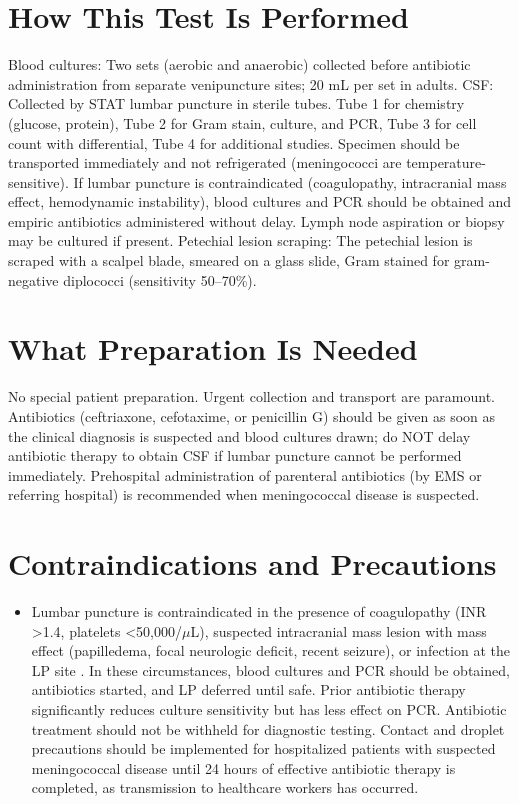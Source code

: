 \section*{How This Test Is Performed}
Blood cultures: Two sets (aerobic and anaerobic) collected before antibiotic administration from separate venipuncture sites; 20 mL per set in adults. CSF: Collected by STAT lumbar puncture in sterile tubes. Tube 1 for chemistry (glucose, protein), Tube 2 for Gram stain, culture, and PCR, Tube 3 for cell count with differential, Tube 4 for additional studies. Specimen should be transported immediately and not refrigerated (meningococci are temperature-sensitive). If lumbar puncture is contraindicated (coagulopathy, intracranial mass effect, hemodynamic instability), blood cultures and PCR should be obtained and empiric antibiotics administered without delay. Lymph node aspiration or biopsy may be cultured if present. Petechial lesion scraping: The petechial lesion is scraped with a scalpel blade, smeared on a glass slide, Gram stained for gram-negative diplococci (sensitivity 50--70\%).

\section*{What Preparation Is Needed}
No special patient preparation. Urgent collection and transport are paramount. Antibiotics (ceftriaxone, cefotaxime, or penicillin G) should be given as soon as the clinical diagnosis is suspected and blood cultures drawn; do NOT delay antibiotic therapy to obtain CSF if lumbar puncture cannot be performed immediately. Prehospital administration of parenteral antibiotics (by EMS or referring hospital) is recommended when meningococcal disease is suspected.

\section*{Contraindications and Precautions}
\begin{itemize}
  \item Lumbar puncture is contraindicated in the presence of coagulopathy (INR >1.4, platelets <50,000/$\mu$L), suspected intracranial mass lesion with mass effect (papilledema, focal neurologic deficit, recent seizure), or infection at the LP site \cite{tunkel2004practice}. In these circumstances, blood cultures and PCR should be obtained, antibiotics started, and LP deferred until safe. Prior antibiotic therapy significantly reduces culture sensitivity but has less effect on PCR. Antibiotic treatment should not be withheld for diagnostic testing. Contact and droplet precautions should be implemented for hospitalized patients with suspected meningococcal disease until 24 hours of effective antibiotic therapy is completed, as transmission to healthcare workers has occurred.
\end{itemize}
